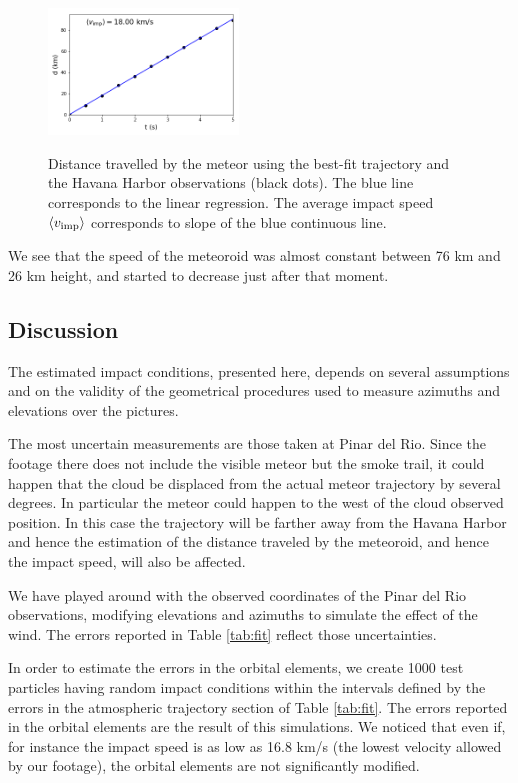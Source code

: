 \documentclass[fleqn,usenatbib]{mnras}
\newcommand{\sub}[1]{_{\rm #1}}
\newcommand{\vimp}{v\sub{imp}}
\begin{document}
\begin{figure}  
  \centering
  \includegraphics[width=0.45\textwidth]{impact-speed.png}
\label{fig:speed}
\caption{Distance travelled by the meteor using the best-fit trajectory and the Havana Harbor observations (black dots). The blue line corresponds to the linear regression.  The average impact speed $\langle\vimp\rangle$ corresponds to slope of the blue continuous line.}
\end{figure}

We see that the speed of the meteoroid was almost constant between 76 km and 26 km height, and started to decrease just after that moment. 

\subsection{Discussion}

The estimated impact conditions, presented here, depends on several assumptions and on the validity of the geometrical procedures used to measure azimuths and elevations over the pictures.  

The most uncertain measurements are those taken at Pinar del Rio.  Since the footage there does not include the visible meteor but the smoke trail, it could happen that the cloud be displaced from the actual meteor trajectory by several degrees. In particular the meteor could happen to the west of the cloud observed position.  In this case the trajectory will be farther away from the Havana Harbor and hence the estimation of the distance traveled by the meteoroid, and hence the impact speed, will also be affected.  

We have played around with the observed coordinates of the Pinar del Rio observations, modifying elevations and azimuths to simulate the effect of the wind.  The errors reported in Table \ref{tab:fit} reflect those uncertainties.

In order to estimate the errors in the orbital elements, we create 1000 test particles having random impact conditions within the intervals defined by the errors in the atmospheric trajectory section of Table \ref{tab:fit}.  The errors reported in the orbital elements are the result of this simulations.  We noticed that even if, for instance the impact speed is as low as 16.8 km/s (the lowest velocity allowed by our footage), the orbital elements are not significantly modified.
\end{document}
